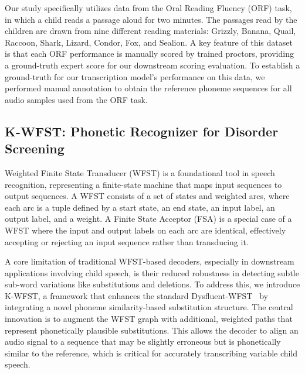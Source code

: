 Our study specifically utilizes data from the Oral Reading Fluency (ORF) task, in which a child reads a passage aloud for two minutes. The passages read by the children are drawn from nine different reading materials: Grizzly, Banana, Quail, Raccoon, Shark, Lizard, Condor, Fox, and Sealion. A key feature of this dataset is that each ORF performance is manually scored by trained proctors, providing a ground-truth expert score for our downstream scoring evaluation. To establish a ground-truth for our transcription model's performance on this data, we performed manual annotation to obtain the reference phoneme sequences for all audio samples used from the ORF task.



\subsection{K-WFST: Phonetic Recognizer for Disorder Screening}

Weighted Finite State Transducer (WFST) is a foundational tool in speech recognition, representing a finite-state machine that maps input sequences to output sequences. A WFST consists of a set of states and weighted arcs, where each arc is a tuple defined by a start state, an end state, an input label, an output label, and a weight. A Finite State Acceptor (FSA) is a special case of a WFST where the input and output labels on each arc are identical, effectively accepting or rejecting an input sequence rather than transducing it.

A core limitation of traditional WFST-based decoders, especially in downstream applications involving child speech, is their reduced robustness in detecting subtle sub-word variations like substitutions and deletions. To address this, we introduce K-WFST, a framework that enhances the standard Dysfluent-WFST~\cite{guo2025dysfluentwfstframeworkzeroshot} by integrating a novel phoneme similarity-based substitution structure. The central innovation is to augment the WFST graph with additional, weighted paths that represent phonetically plausible substitutions. This allows the decoder to align an audio signal to a sequence that may be slightly erroneous but is phonetically similar to the reference, which is critical for accurately transcribing variable child speech.


